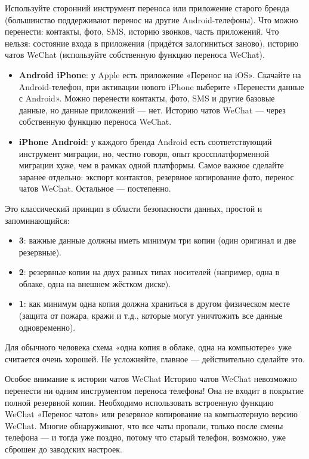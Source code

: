 
Используйте сторонний инструмент переноса или приложение старого бренда (большинство поддерживают перенос на другие Android-телефоны). Что можно перенести: контакты, фото, SMS, историю звонков, часть приложений. Что нельзя: состояние входа в приложения (придётся залогиниться заново), историю чатов WeChat (используйте собственную функцию переноса WeChat).


\begin{itemize}
  \item \textbf{Android iPhone}: у Apple есть приложение «Перенос на iOS». Скачайте на Android-телефон, при активации нового iPhone выберите «Перенести данные с Android». Можно перенести контакты, фото, SMS и другие базовые данные, но данные приложений — нет. Историю чатов WeChat — через собственную функцию переноса WeChat.
  \item \textbf{iPhone Android}: у каждого бренда Android есть соответствующий инструмент миграции, но, честно говоря, опыт кроссплатформенной миграции хуже, чем в рамках одной платформы. Самое важное сделайте заранее отдельно: экспорт контактов, резервное копирование фото, перенос чатов WeChat. Остальное — постепенно.
\end{itemize}


Это классический принцип в области безопасности данных, простой и запоминающийся:

\begin{itemize}
  \item \textbf{3}: важные данные должны иметь минимум три копии (один оригинал и две резервные).
  \item \textbf{2}: резервные копии на двух разных типах носителей (например, одна в облаке, одна на внешнем жёстком диске).
  \item \textbf{1}: как минимум одна копия должна храниться в другом физическом месте (защита от пожара, кражи и т.д., которые могут уничтожить все данные одновременно).
\end{itemize}

Для обычного человека схема «одна копия в облаке, одна на компьютере» уже считается очень хорошей. Не усложняйте, главное — действительно сделайте это.

\begin{tcbwarn}{Особое внимание к истории чатов WeChat}
Историю чатов WeChat невозможно перенести ни одним инструментом переноса телефона! Она не входит в покрытие полной резервной копии. Необходимо использовать встроенную функцию WeChat «Перенос чатов» или резервное копирование на компьютерную версию WeChat. Многие обнаруживают, что все чаты пропали, только после смены телефона — и тогда уже поздно, потому что старый телефон, возможно, уже сброшен до заводских настроек.

\end{tcbwarn}

